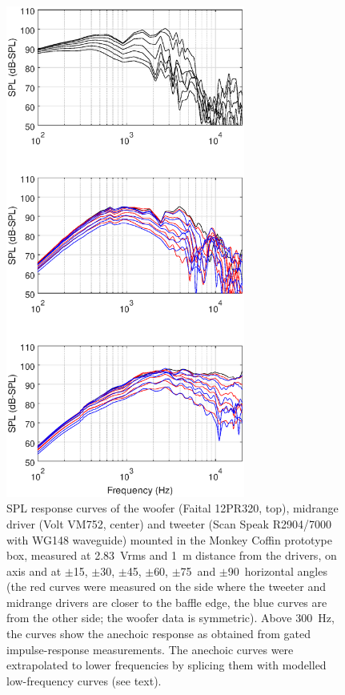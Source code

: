 \documentclass[12pt,a4paper]{article}
\providecommand{\figlabel}[1]{\label{fig:#1}}
\begin{document}
\begin{figure}[tbp]
	\centering
	\vspace{-10ex}
	\includegraphics[width=0.7\textwidth]{SPL_curves_raw.eps}
	\caption{SPL response curves of the woofer (Faital 12PR320, top), midrange driver (Volt VM752, center) and tweeter (Scan Speak R2904/7000 with WG148 wave\-guide) mounted in the Monkey Coffin prototype box, measured at \SI{2.83}{Vrms} and \SI{1}{m} distance from the drivers, on axis and at $\pm$15\degree, $\pm$30\degree, $\pm$45\degree, $\pm$60\degree, $\pm$75\degree\ and $\pm$90\degree\ horizontal angles (the red curves were measured on the side where the tweeter and midrange drivers are closer to the baffle edge, the blue curves are from the other side; the woofer data is symmetric). Above \SI{300}{Hz}, the curves show the anechoic response as obtained from gated impulse-response measurements. The anechoic curves were extrapolated to lower frequencies by splicing them with modelled low-frequency curves (see text).}
	\figlabel{SPL_curves_raw}
\end{figure}
\end{document}
